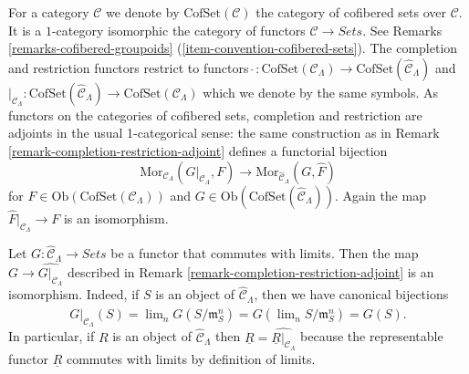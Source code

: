 \begin{remark}
\label{remark-completion-restriction-cofset-adjoint}
For a category $\mathcal{C}$ we denote by $\text{CofSet}(\mathcal{C})$ the
category of cofibered sets over $\mathcal{C}$. It is a $1$-category
isomorphic the category of functors $\mathcal{C} \to \textit{Sets}$.
See Remarks \ref{remarks-cofibered-groupoids}
(\ref{item-convention-cofibered-sets}).
The completion and restriction functors restrict to functors
$\widehat{~} : \text{CofSet}(\mathcal{C}_\Lambda) \to 
\text{CofSet}(\widehat{\mathcal{C}}_\Lambda)$ and
$|_{\mathcal{C}_\Lambda} : \text{CofSet}(\widehat{\mathcal{C}}_\Lambda) \to
\text{CofSet}(\mathcal{C}_\Lambda)$ which we denote by the same symbols.
As functors on the categories of cofibered sets, completion and restriction 
are adjoints in the usual 1-categorical sense: the same construction as in 
Remark \ref{remark-completion-restriction-adjoint} defines a functorial 
bijection
$$
\text{Mor}_{\mathcal{C}_\Lambda}(G|_{\mathcal{C}_\Lambda}, F) 
\longrightarrow
\text{Mor}_{\widehat{\mathcal{C}}_\Lambda}(G, \widehat{F}) 
$$
for $F \in \text{Ob}(\text{CofSet}(\mathcal{C}_\Lambda))$ and
$G \in \text{Ob}(\text{CofSet}(\widehat{\mathcal{C}}_\Lambda))$.
Again the map $\widehat{F}|_{\mathcal{C}_\Lambda} \to F$ is an 
isomorphism.
\end{remark}

\begin{remark}
\label{remark-restrict-complete-continuous-functor}
Let $G : \widehat{\mathcal{C}}_\Lambda \to \textit{Sets}$
be a functor that commutes with limits.
Then the map $G \to \widehat{G|_{\mathcal{C}_\Lambda}}$ described in 
Remark \ref{remark-completion-restriction-adjoint}
is an isomorphism. Indeed, if $S$ is  an object of
$\widehat{\mathcal{C}}_\Lambda$, then we have canonical bijections
$$
\widehat{G|_{\mathcal{C}_\Lambda}}(S) =
\lim\nolimits_n G(S/\mathfrak{m}_{S}^n) =
G(\lim\nolimits_n S/\mathfrak{m}_{S}^n) = G(S).
$$
In particular, if $R$ is an object of $\widehat{\mathcal{C}}_\Lambda$ then 
$\underline{R} = \widehat{\underline{R}|_{\mathcal{C}_\Lambda}}$ because
the representable functor $\underline{R}$ commutes with limits by definition
of limits.
\end{remark}

